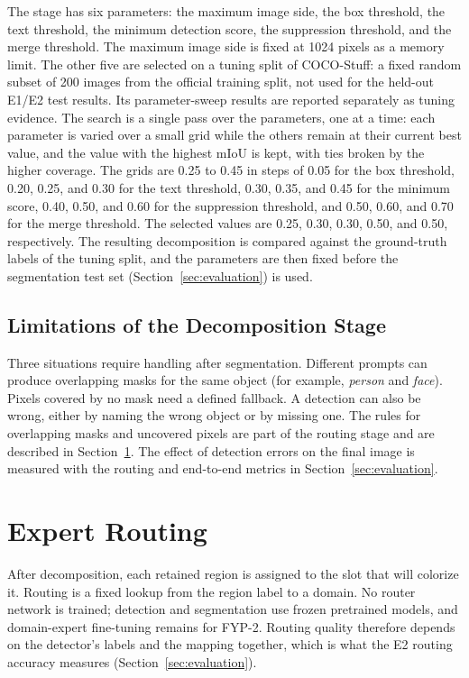\documentclass{FastFyp}
\begin{document}
The stage has six parameters: the maximum image side, the box threshold, the text threshold, the minimum detection score, the suppression threshold, and the merge threshold. The maximum image side is fixed at 1024 pixels as a memory limit. The other five are selected on a tuning split of COCO-Stuff: a fixed random subset of 200 images from the official training split, not used for the held-out E1/E2 test results. Its parameter-sweep results are reported separately as tuning evidence. The search is a single pass over the parameters, one at a time: each parameter is varied over a small grid while the others remain at their current best value, and the value with the highest mIoU is kept, with ties broken by the higher coverage. The grids are 0.25 to 0.45 in steps of 0.05 for the box threshold, 0.20, 0.25, and 0.30 for the text threshold, 0.30, 0.35, and 0.45 for the minimum score, 0.40, 0.50, and 0.60 for the suppression threshold, and 0.50, 0.60, and 0.70 for the merge threshold. The selected values are 0.25, 0.30, 0.30, 0.50, and 0.50, respectively. The resulting decomposition is compared against the ground-truth labels of the tuning split, and the parameters are then fixed before the segmentation test set (Section~\ref{sec:evaluation}) is used.

\subsection{Limitations of the Decomposition Stage}

Three situations require handling after segmentation. Different prompts can produce overlapping masks for the same object (for example, \textit{person} and \textit{face}). Pixels covered by no mask need a defined fallback. A detection can also be wrong, either by naming the wrong object or by missing one. The rules for overlapping masks and uncovered pixels are part of the routing stage and are described in Section~\ref{sec:routing}. The effect of detection errors on the final image is measured with the routing and end-to-end metrics in Section~\ref{sec:evaluation}.

\section{Expert Routing}
\label{sec:routing}

After decomposition, each retained region is assigned to the slot that will colorize it. Routing is a fixed lookup from the region label to a domain. No router network is trained; detection and segmentation use frozen pretrained models, and domain-expert fine-tuning remains for FYP-2. Routing quality therefore depends on the detector's labels and the mapping together, which is what the E2 routing accuracy measures (Section~\ref{sec:evaluation}).
\end{document}
